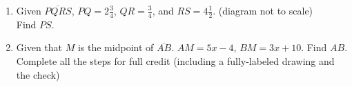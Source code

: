 \documentclass[12pt, twoside]{article}
\begin{document}
\begin{enumerate}
\item Given $\overline{PQRS}$, $PQ=2 \frac{3}{4}$, $QR=\frac{3}{4}$, and $RS= 4 \frac{1}{2}$. (diagram not to scale)\\ [0.25cm]
  Find ${PS}$.\\[.5in]
      \vspace{4cm}

\item Given that $M$ is the midpoint of $\overline{AB}$. $AM=5x-4$, $BM=3x+10$. Find ${AB}$.\\
Complete all the steps for full credit (including a fully-labeled drawing and the check)

\end{enumerate}
\end{document}

